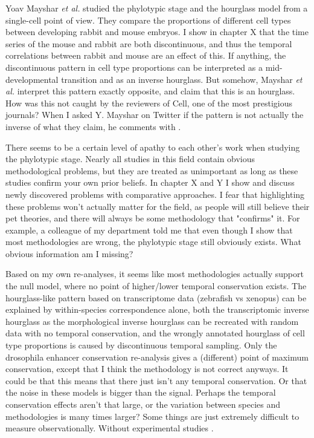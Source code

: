 Yoav Mayshar \textit{et al.} studied the phylotypic stage and the hourglass model from a single-cell point of view\cite{Mayshar2023}. They compare the proportions of different cell types between developing rabbit and mouse embryos. I show in chapter X that the time series of the mouse and rabbit are both discontinuous, and thus the temporal correlations between rabbit and mouse are an effect of this. If anything, the discontinuous pattern in cell type proportions can be interpreted as a mid-developmental transition and as an inverse hourglass. But somehow, Mayshar \textit{et al.} interpret this pattern exactly opposite, and claim that this is an hourglass. How was this not caught by the reviewers of Cell, one of the most prestigious journals? When I asked Y. Mayshar on Twitter if the pattern is not actually the inverse of what they claim, he comments with . 

There seems to be a certain level of apathy to each other's work when studying the phylotypic stage. Nearly all studies in this field contain obvious methodological problems, but they are treated as unimportant as long as these studies confirm your own prior beliefs. In chapter X and Y I show and discuss newly discovered problems with comparative approaches. I fear that highlighting these problems won't actually matter for the field, as people will still believe their pet theories, and there will always be some methodology that "confirms" it. For example, a colleague of my department told me that even though I show that most methodologies are wrong, the phylotypic stage still obviously exists. What obvious information am I missing?

Based on my own re-analyses, it seems like most methodologies actually support the null model, where no point of higher/lower temporal conservation exists. The hourglass-like pattern based on transcriptome data (zebrafish vs xenopus) can be explained by within-species correspondence alone, both the transcriptomic inverse hourglass as the morphological inverse hourglass can be recreated with random data with no temporal conservation, and the wrongly annotated hourglass of cell type proportions is caused by discontinuous temporal sampling. Only the drosophila enhancer conservation re-analysis gives a (different) point of maximum conservation, except that I think the methodology is not correct anyways. It could be that this means that there just isn't any temporal conservation. Or that the noise in these models is bigger than the signal. Perhaps the temporal conservation effects aren't that large, or the variation between species and methodologies is many times larger? Some things are just extremely difficult to measure observationally. Without experimental studies .

